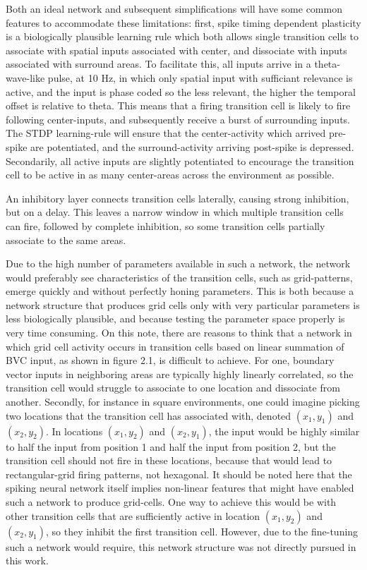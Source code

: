 \documentclass{article}
\begin{document}
    Both an ideal network and subsequent simplifications will have some common features to accommodate these limitations: first, spike timing dependent plasticity is a biologically plausible learning rule which both allows single transition cells to associate with spatial inputs associated with center, and dissociate with inputs associated with surround areas. To facilitate this, all inputs arrive in a theta-wave-like pulse, at 10 Hz, in which only spatial input with sufficiant relevance is active, and the input is phase coded so the less relevant, the higher the temporal offset is relative to theta. This means that a firing transition cell is likely to fire following center-inputs, and subsequently receive a burst of surrounding inputs. The STDP learning-rule will ensure that the center-activity which arrived pre-spike are potentiated, and the surround-activity arriving post-spike is depressed. Secondarily, all active inputs are slightly potentiated to encourage the transition cell to be active in as many center-areas across the environment as possible.
    
    An inhibitory layer connects transition cells laterally, causing strong inhibition, but on a delay. This leaves a narrow window in which multiple transition cells can fire, followed by complete inhibition, so some transition cells partially associate to the same areas.

    Due to the high number of parameters available in such a network, the network would preferably see characteristics of the transition cells, such as grid-patterns, emerge quickly and without perfectly honing parameters.
    This is both because a network structure that produces grid cells only with very particular parameters is less biologically plausible, and because testing the parameter space properly is very time consuming. On this note, there are reasons to think that a network in which grid cell activity occurs in transition cells based on linear summation of BVC input, as shown in figure 2.1, is difficult to achieve. For one, boundary vector inputs in neighboring areas are typically highly linearly correlated, so the transition cell would struggle to associate to one location and dissociate from another. Secondly, for instance in square environments, one could imagine picking two locations that the transition cell has associated with, denoted \((x_1, y_1)\) and \((x_2, y_2)\). In locations \((x_1, y_2)\) and \((x_2, y_1)\), the input would be highly similar to half the input from position 1 and half the input from position 2, but the transition cell should not fire in these locations, because that would lead to rectangular-grid firing patterns, not hexagonal. It should be noted here that the spiking neural network itself implies non-linear features that might have enabled such a network to produce grid-cells. One way to achieve this would be with other transition cells that are sufficiently active in location \((x_1, y_2)\) and \((x_2, y_1)\), so they inhibit the first transition cell. However, due to the fine-tuning such a network would require, this network structure was not directly pursued in this work.
\end{document}
